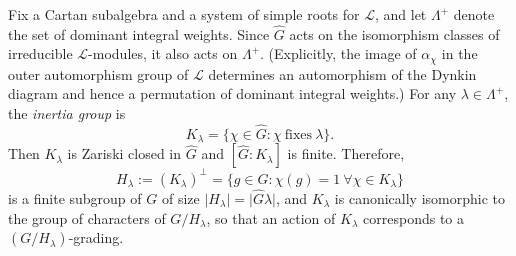 \documentclass[a4paper,reqno]{amsart}
\theoremstyle{definition}
\numberwithin{theorem}{section}
\numberwithin{equation}{section}
\begin{document}
Fix a Cartan subalgebra and a system of simple roots for ${\mathcal{L}}$, and let $\Lambda^+$ denote the set of dominant integral weights. Since ${\widehat{{G}}}$ acts on the isomorphism classes of irreducible ${\mathcal{L}}$-modules, it also acts on $\Lambda^+$. (Explicitly, the image of $\alpha_\chi$ in the outer automorphism group of ${\mathcal{L}}$ determines an automorphism of the Dynkin diagram and hence a permutation of dominant integral weights.) For any $\lambda \in\Lambda^+$, the \emph{inertia group} is 
\[
K_\lambda=\{\chi\in {\widehat{{G}}}: \chi\ \text{fixes}\ \lambda\}.
\]
Then $K_\lambda$ is Zariski closed in ${\widehat{{G}}}$ and $[{\widehat{{G}}}:K_\lambda]$ is finite. Therefore, 
\[
H_\lambda{:=} (K_\lambda)^\perp=\{g\in G: \chi(g)=1\ \forall \chi\in K_\lambda\}
\]
is a finite subgroup of $G$ of size $\lvert H_\lambda\rvert=\lvert {\widehat{{G}}}\lambda\rvert$, and $K_\lambda$ is canonically isomorphic to the group of characters of $G/H_\lambda$, so that an action of $K_\lambda$ corresponds to a $(G/H_\lambda)$-grading.
\end{document}
